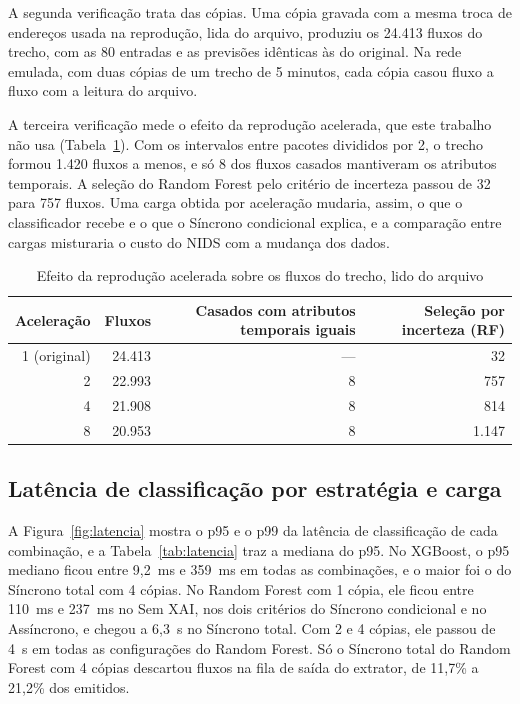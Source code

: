 \documentclass[
  article,
  12pt,
  oneside,
  a4paper,
  english,
  brazil
]{abntex2}
\begin{document}
A segunda verificação trata das cópias. Uma cópia gravada com a mesma troca de endereços usada na
reprodução, lida do arquivo, produziu os 24.413 fluxos do trecho, com as 80 entradas e as previsões
idênticas às do original. Na rede emulada, com duas cópias de um trecho de 5 minutos, cada cópia
casou fluxo a fluxo com a leitura do arquivo.

A terceira verificação mede o efeito da reprodução acelerada, que este trabalho não usa
(Tabela~\ref{tab:aceleracao}). Com os intervalos entre pacotes divididos por 2, o trecho formou
1.420 fluxos a menos, e só 8 dos fluxos casados mantiveram os atributos temporais. A seleção do
Random Forest pelo critério de incerteza passou de 32 para 757 fluxos. Uma carga obtida por
aceleração mudaria, assim, o que o classificador recebe e o que o Síncrono condicional explica, e a
comparação entre cargas misturaria o custo do NIDS com a mudança dos dados.

\begin{table}[htbp]
  \centering
  \caption{Efeito da reprodução acelerada sobre os fluxos do trecho, lido do arquivo}
  \label{tab:aceleracao}
  \begin{tabular}{rrrr}
    \toprule
    Aceleração & Fluxos & Casados com atributos temporais iguais & Seleção por incerteza (RF) \\
    \midrule
    1 (original) & 24.413 & --- & 32 \\
    2 & 22.993 & 8 & 757 \\
    4 & 21.908 & 8 & 814 \\
    8 & 20.953 & 8 & 1.147 \\
    \bottomrule
  \end{tabular}
\end{table}

\subsection{Latência de classificação por estratégia e carga}

A Figura~\ref{fig:latencia} mostra o p95 e o p99 da latência de classificação de cada combinação,
e a Tabela~\ref{tab:latencia} traz a mediana do p95. No XGBoost, o p95 mediano ficou entre 9,2~ms e
359~ms em todas as combinações, e o maior foi o do Síncrono total com 4 cópias. No Random Forest com
1 cópia, ele ficou entre 110~ms e 237~ms no Sem XAI, nos dois critérios do Síncrono condicional e no
Assíncrono, e chegou a 6,3~s no Síncrono total. Com 2 e 4 cópias, ele passou de 4~s em todas as
configurações do Random Forest. Só o Síncrono total do Random Forest com 4 cópias descartou fluxos na
fila de saída do extrator, de 11,7\% a 21,2\% dos emitidos.
\end{document}
